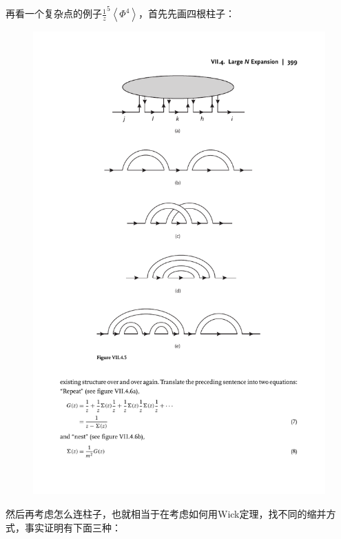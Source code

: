 \begin{example}
	再看一个复杂点的例子$\frac1 z^5\left<\Phi^4\right>$，首先先画四根柱子：
	\begin{figure}[H]
		\centering
		\includegraphics{figs/fig8.pdf}
	\end{figure}
	然后再考虑怎么连柱子，也就相当于在考虑如何用Wick定理，找不同的缩并方式，事实证明有下面三种：
	\begin{figure}[H]
		\centering

\end{figure}
\end{example}
